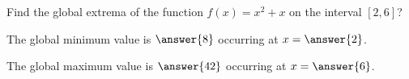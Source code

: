 \documentclass{ximera}
\begin{document}
\begin{exercise}

Find the global extrema of the function $f(x) = x^2 +x$ on the interval
$[2,6]$?

The global minimum value is $\answer{8}$ occurring at $x = \answer{2}$.

The global maximum value is $\answer{42}$ occurring at $x = \answer{6}$.

\end{exercise}
\end{document}
